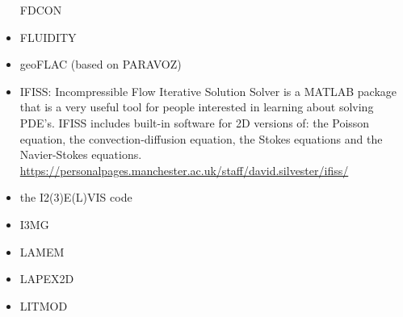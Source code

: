 \begin{itemize}
\index FDCON
\cite{enbs05}
\cite{fusc13}
\cite{fuks15}


\item FLUIDITY
\cite{dawk11}
\cite{gagd14}

\item geoFLAC (based on PARAVOZ)
\cite{jala19}

\item IFISS: Incompressible Flow Iterative Solution Solver is a
MATLAB package that is a very useful tool for people interested in
learning about solving PDE’s.
IFISS includes built-in software for 2D versions of:
the Poisson equation, the convection-diffusion equation, the Stokes equations
and the Navier-Stokes equations.\\
\url{https://personalpages.manchester.ac.uk/staff/david.silvester/ifiss/}



\item the I2(3)E(L)VIS code

\cite{geyu03}\cite{geyu03b}\cite{geur03}
\cite{geym04}\cite{geys04}\cite{gepm04}
\cite{buge05}
\cite{bbeg06}\cite{gest06}\cite{gogc06}\cite{gecy06}
\cite{geyu07}\cite{gogc07}
\cite{scbe08}\cite{gecy08}\cite{uegs08}\cite{fagc08}\cite{zgyh09}
\cite{gefc09}
\cite{gerya2010}\cite{nigm10}
\cite{dugm11}\cite{dumg11}\cite{lixg11}\cite{gery11}\cite{geme11}
\cite{crsg12}\cite{dugk12}\cite{lixg12}
\cite{lixg13}\cite{nabg13}\cite{magc13}\cite{digd13a}\cite{digd13b}\cite{zhgt13}\cite{dyge13}\cite{gemd13}\cite{mana13}
\cite{dugs14}\cite{puge14}\cite{rugb14}\cite{voge14b}\cite{bagb14}\cite{lige14}\cite{stjm14}\cite{malg14}
\cite{buge14}\cite{gosk14}\cite{bagb14}\cite{vamd14}
\cite{duay15}\cite{uewg15}\cite{rula15}\cite{gesb15}\cite{rula15}
\cite{kobc16}\cite{magc16}\cite{fige16}
\cite{kobg19}\cite{ligc19}

\item I3MG
\cite{facc14}

\item LAMEM
\cite{scbe08}
\cite{kamm10}
\cite{lemk11}
\cite{may12}
\cite{lesh13}
\cite{cokm14}
\cite{feka14a}
\cite{feka14b}
\cite{puka15}
\cite{feka15}
\cite{cofk15}
\cite{kapb16}

\item LAPEX2D
\cite{sopg05}
\cite{bbeg06}
\cite{baso08}
\cite{scbe08}
\cite{sosk11}


\item LITMOD
\cite{fuac09}
\cite{affr08}
\cite{afrf07}
\cite{fufa10}



\end{itemize}
